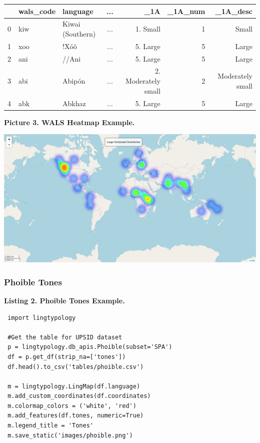 \documentclass[a4paper,12pt]{article}
\begin{document}
\begin{adjustbox}{max width=\textwidth}
\begin{tabular}{ l | l | l | c | r | r | r }
    ~ & wals\_code & language & ... & \_1A & \_1A\_num & \_1A\_desc \\
    \hline
    0 & kiw &  Kiwai (Southern) & ... & 1. Small & 1 & Small \\
    1 & xoo & !Xóõ & ... & 5. Large & 5 & Large \\
    2 & ani & //Ani & ... & 5. Large & 5 & Large \\
    3 & abi & Abipón & ... & 2. Moderately small & 2 & Moderately small \\
    4 & abk & Abkhaz & ... & 5. Large & 5 & Large \\
\end{tabular}
\end{adjustbox}

\bigskip

\begin{samepage}
\textbf{Picture 3. WALS Heatmap Example.}\nopagebreak

\includegraphics[width=\textwidth]{images/WalsHeatMap.png}
\end{samepage}

\subsubsection{Phoible Tones}

\textbf{Listing 2. Phoible Tones Example.}
\begin{lstlisting}
 import lingtypology

 #Get the table for UPSID dataset
 p = lingtypology.db_apis.Phoible(subset='SPA')
 df = p.get_df(strip_na=['tones'])
 df.head().to_csv('tables/phoible.csv')
 
 m = lingtypology.LingMap(df.language)
 m.add_custom_coordinates(df.coordinates)
 m.colormap_colors = ('white', 'red')
 m.add_features(df.tones, numeric=True)
 m.legend_title = 'Tones'
 m.save_static('images/phoible.png')
\end{lstlisting}
\end{document}
